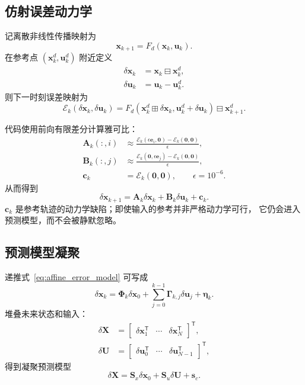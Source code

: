 \documentclass[UTF8,a4paper,11pt]{ctexart}
\begin{document}
\subsection{仿射误差动力学}

记离散非线性传播映射为
\begin{equation}
  \bm x_{k+1}=F_d(\bm x_k,\bm u_k).
\end{equation}
在参考点 $(\bm x_k^d,\bm u_k^d)$ 附近定义
\begin{align}
  \delta\bm x_k &= \bm x_k\boxminus\bm x_k^d,\\
  \delta\bm u_k &= \bm u_k-\bm u_k^d.
\end{align}
则下一时刻误差映射为
\begin{equation}
  \mathcal E_k(\delta\bm x_k,\delta\bm u_k)=
  F_d(\bm x_k^d\boxplus\delta\bm x_k,
      \bm u_k^d+\delta\bm u_k)
  \boxminus\bm x_{k+1}^d.
\end{equation}

代码使用前向有限差分计算雅可比：
\begin{align}
  \bm A_k(:,i)&\approx
  \frac{\mathcal E_k(\epsilon\bm e_i,\bm0)
        -\mathcal E_k(\bm0,\bm0)}{\epsilon},\\
  \bm B_k(:,j)&\approx
  \frac{\mathcal E_k(\bm0,\epsilon\bm e_j)
        -\mathcal E_k(\bm0,\bm0)}{\epsilon},\\
  \bm c_k&=\mathcal E_k(\bm0,\bm0),
  \qquad \epsilon=10^{-6}.
\end{align}
从而得到
\begin{equation}
  \delta\bm x_{k+1}
  =\bm A_k\delta\bm x_k
  +\bm B_k\delta\bm u_k+\bm c_k.
  \label{eq:affine_error_model}
\end{equation}
$\bm c_k$ 是参考轨迹的动力学缺陷；即使输入的参考并非严格动力学可行，
它仍会进入预测模型，而不会被静默忽略。

\subsection{预测模型凝聚}

递推式~\eqref{eq:affine_error_model} 可写成
\begin{equation}
  \delta\bm x_k=\bm\Phi_k\delta\bm x_0
  +\sum_{j=0}^{k-1}\bm\Gamma_{k,j}\delta\bm u_j
  +\bm\eta_k.
\end{equation}
堆叠未来状态和输入：
\begin{align}
  \delta\bm X&=
  \begin{bmatrix}
    \delta\bm x_1^\mathsf T&\cdots&\delta\bm x_N^\mathsf T
  \end{bmatrix}^{\mathsf T},\\
  \delta\bm U&=
  \begin{bmatrix}
    \delta\bm u_0^\mathsf T&\cdots&\delta\bm u_{N-1}^\mathsf T
  \end{bmatrix}^{\mathsf T},
\end{align}
得到凝聚预测模型
\begin{equation}
  \delta\bm X
  =\bm S_x\delta\bm x_0+\bm S_u\delta\bm U+\bm s_c.
  \label{eq:condensed_prediction}
\end{equation}
\end{document}
